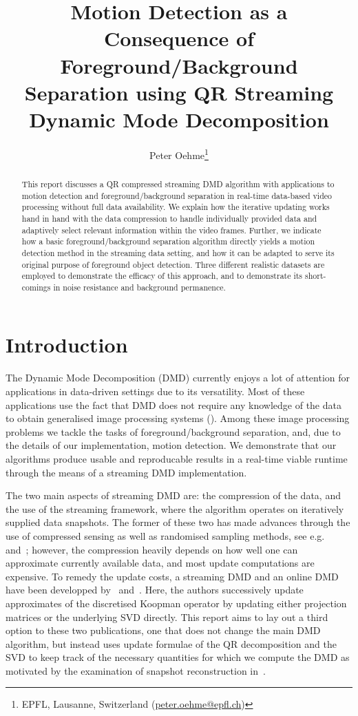 \documentclass{article}
\title{Motion Detection as a Consequence of Foreground/Background Separation using QR Streaming Dynamic Mode Decomposition}
\author{Peter Oehme\thanks{EPFL, Lausanne, Switzerland (\href{mailto:peter.oehme@epfl.ch}{peter.oehme@epfl.ch})}}
\begin{document}
    \maketitle

    \begin{abstract}
        This report discusses a QR compressed streaming DMD algorithm with applications to motion detection and foreground/background separation in real-time data-based video processing without full data availability. We explain how the iterative updating works hand in hand with the data compression to handle individually provided data and adaptively select relevant information within the video frames. Further, we indicate how a basic foreground/background separation algorithm directly yields a motion detection method in the streaming data setting, and how it can be adapted to serve its original purpose of foreground object detection. Three different realistic datasets are employed to demonstrate the efficacy of this approach, and to demonstrate its short-comings in noise resistance and background permanence.
    \end{abstract}

    \section{Introduction}

    The Dynamic Mode Decomposition (DMD) currently enjoys a lot of attention for applications in data-driven settings due to its versatility. Most of these applications use the fact that DMD does not require any knowledge of the data to obtain generalised image processing systems (\cite{Grosek2014, Kutz2015, Bi2018, Erichson2019a, UlHaq2020}). Among these image processing problems we tackle the tasks of foreground/background separation, and, due to the details of our implementation, motion detection. We demonstrate that our algorithms produce usable and reproducable results in a real-time viable runtime through the means of a streaming DMD implementation.

    The two main aspects of streaming DMD are: the compression of the data, and the use of the streaming framework, where the algorithm operates on iteratively supplied data snapshots. The former of these two has made advances through the use of compressed sensing as well as randomised sampling methods, see e.g.~\cite{Brunton2016a} and~\cite{Erichson2019}; however, the compression heavily depends on how well one can approximate currently available data, and most update computations are expensive. To remedy the update costs, a streaming DMD and an online DMD have been developped by~\cite{Hemati2014} and~\cite{Nedzhibov2023}. Here, the authors successively update approximates of the discretised Koopman operator by updating either projection matrices or the underlying SVD directly. This report aims to lay out a third option to these two publications, one that does not change the main DMD algorithm, but instead uses update formulae of the QR decomposition and the SVD to keep track of the necessary quantities for which we compute the DMD as motivated by the examination of snapshot reconstruction in~\cite{Drmac2020VandermondeKhatriRao}.
\end{document}
